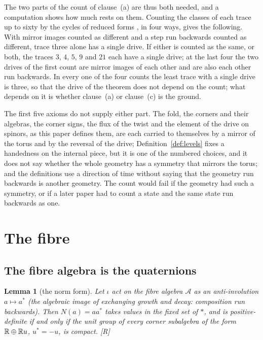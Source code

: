 \documentclass[11pt,a4paper]{article}
\theoremstyle{plain}
\newtheorem{lemma}[theorem]{Lemma}
\theoremstyle{definition}
\theoremstyle{remark}
\newcommand{\rigR}{[\textup{R}]}
\begin{document}
The two parts of the count of clause~(a) are thus both needed, and a computation shows how much rests on them. Counting the classes of each trace up to sixty by the cycles of reduced forms \cite{Gauss1801}, in four ways, gives the following. With mirror images counted as different and a step run backwards counted as different, trace three alone has a single drive. If either is counted as the same, or both, the traces $3$, $4$, $5$, $9$ and $21$ each have a single drive; at the last four the two drives of the first count are mirror images of each other and are also each other run backwards. In every one of the four counts the least trace with a single drive is three, so that the drive of the theorem does not depend on the count; what depends on it is whether clause~(a) or clause~(c) is the ground.

The first five axioms do not supply either part. The fold, the corners and their algebras, the corner signs, the flux of the twist and the element of the drive on spinors, as this paper defines them, are each carried to themselves by a mirror of the torus and by the reversal of the drive; Definition~\ref{def:levels} fixes a handedness on the internal piece, but it is one of the numbered choices, and it does not say whether the whole geometry has a symmetry that mirrors the torus; and the definitions use a direction of time without saying that the geometry run backwards is another geometry. The count would fail if the geometry had such a symmetry, or if a later paper had to count a state and the same state run backwards as one.

\section{The fibre}\label{sec:fibre}

\subsection{The fibre algebra is the quaternions}

\begin{lemma}[the norm form]\label{lem:norm}
Let $\iota$ act on the fibre algebra $\mathcal{A}$ as an anti-involution $a\mapsto a^{*}$ (the algebraic image of exchanging growth and decay: composition run backwards). Then $N(a)=aa^{*}$ takes values in the fixed set of $*$, and is positive-definite if and only if the unit group of every corner subalgebra of the form $\mathbb{R}\oplus\mathbb{R} u$, $u^{*}=-u$, is compact. \rigR
\end{lemma}
\end{document}
